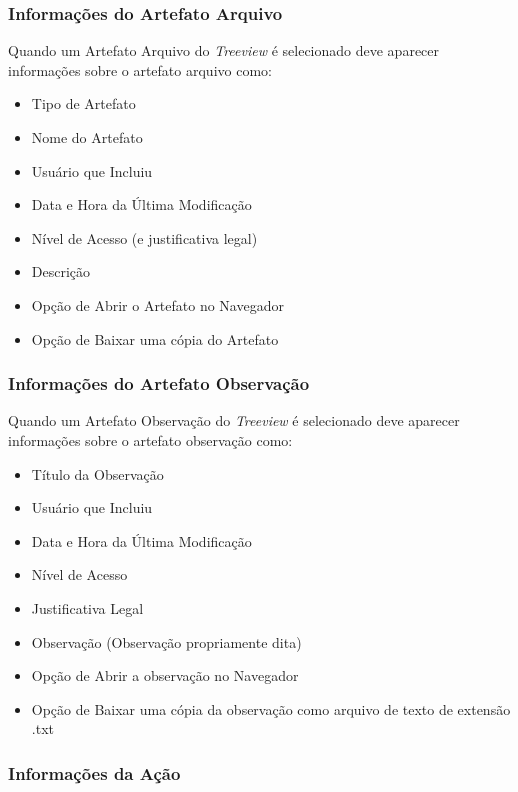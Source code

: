 	\subsubsection{Informações do Artefato Arquivo \msArt}

		Quando um Artefato Arquivo do \emph{Treeview} é selecionado deve aparecer informações sobre o artefato arquivo como:

	
		\begin{itemize}
			\item Tipo de Artefato
			\item Nome do Artefato
			\item Usuário que Incluiu
			\item Data e Hora da Última Modificação
			\item Nível de Acesso (e justificativa legal)
			\item Descrição
			\item Opção de Abrir o Artefato no Navegador
			\item Opção de Baixar uma cópia do Artefato 
		\end{itemize}

	\subsubsection{Informações do Artefato Observação \msObs}

	Quando um Artefato Observação do \emph{Treeview} é selecionado deve aparecer informações sobre o artefato observação como:
	
	
	\begin{itemize}
		\item Título da Observação
		\item Usuário que Incluiu
		\item Data e Hora da Última Modificação
		\item Nível de Acesso
		\item Justificativa Legal
		\item Observação (Observação propriamente dita)
		\item Opção de Abrir a observação no Navegador
		\item Opção de Baixar uma cópia da observação como arquivo de texto de extensão .txt
	\end{itemize}

	
	\subsubsection{Informações da Ação \msAct}

